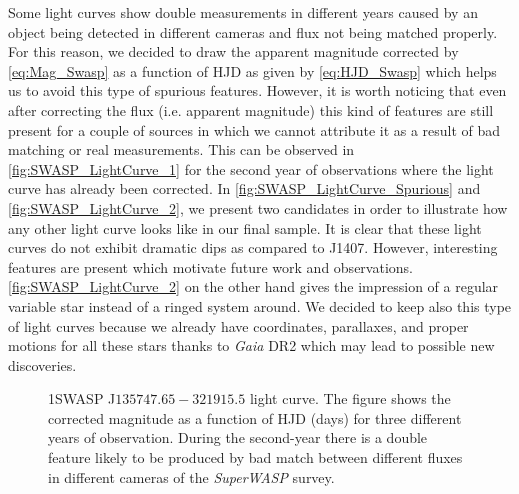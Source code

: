 Some light curves show double measurements in different years caused by an object being detected in different cameras and flux not being matched properly. For this reason, we decided to draw the apparent magnitude corrected by \autoref{eq:Mag_Swasp} as a function of HJD as given by \autoref{eq:HJD_Swasp} which helps us to avoid this type of spurious features. However, it is worth noticing that even after correcting the flux (i.e. apparent magnitude) this kind of features are still present for a couple of sources in which we cannot attribute it as a result of bad matching or real measurements. This can be observed in \autoref{fig:SWASP_LightCurve_1} for the second year of observations where the light curve has already been corrected. In \autoref{fig:SWASP_LightCurve_Spurious} and \autoref{fig:SWASP_LightCurve_2}, we present two candidates in order to illustrate how any other light curve looks like in our final sample. It is clear that these light curves do not exhibit dramatic dips as compared to J1407. However, interesting features are present which motivate future work and observations. \autoref{fig:SWASP_LightCurve_2} on the other hand gives the impression of a regular variable star instead of a ringed system around. We decided to keep also this type of light curves because we already have coordinates, parallaxes, and proper motions for all these stars thanks to \textit{Gaia} DR2 which may lead to possible new discoveries.  

\begin{figure}[!ht]
\centering
\caption{\scriptsize{1SWASP J$135747.65-321915.5$ light curve. The figure shows the corrected magnitude as a function of HJD (days) for three different years of observation. During the second-year there is a double feature likely to be produced by bad match between different fluxes in different cameras of the \textit{SuperWASP} survey.}}
\label{fig:SWASP_LightCurve_1}
\end{figure}

